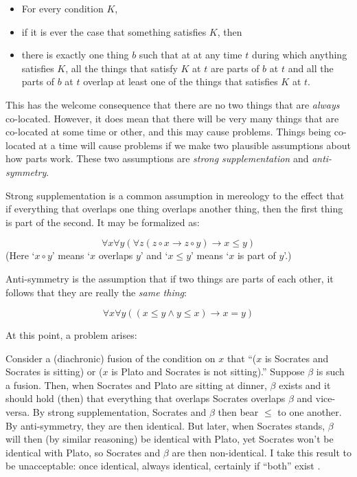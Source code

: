 \documentclass[11pt]{article}
\newenvironment{squote}{%
\begin{spacing}{1}
\begin{list}{}{%
\setlength{\labelwidth}{0pt}%
\rightmargin\leftmargin%
}
\item\relax
}{%
\end{list}%
\end{spacing}
}
\begin{document}
\begin{spacing}{1.5}
\begin{itemize}
  \item For every condition $K$,
  \item if it is ever the case that something satisfies $K$, then
  \item there is exactly one thing $b$ such that at at any time $t$
    during which anything satisfies $K$, all the things that satisfy
    $K$ at $t$ are parts of $b$ at $t$ and all the parts of $b$ at $t$
    overlap at least one of the things that satisfies $K$ at $t$.
\end{itemize}

This has the welcome consequence that there are no two things that are
{\em always} co-located.  However, it does mean that there will be
very many things that are co-located at some time or other, and this
may cause problems.  Things being co-located at a time will cause
problems if we make two plausible assumptions about how parts work.
These two assumptions are {\em strong supplementation} and {\em
  anti-symmetry}.

Strong supplementation is a common assumption in mereology to the
effect that if everything that overlaps one thing overlaps another
thing, then the first thing is part of the second.  It may be
formalized as:

\begin{displaymath}
\forall x \forall y ( \forall z ( z \circ x \rightarrow z \circ y )
\rightarrow x \leq y )
\end{displaymath}
(Here `$x \circ y$' means `$x$ overlaps $y$' and `$x \leq y$' means
`$x$ is part of $y$'.)

Anti-symmetry is the assumption that if two things are parts of each
other, it follows that they are really the {\em same thing}:

\begin{displaymath}
\forall x \forall y ( ( x \leq y \wedge y \leq x ) \rightarrow x = y )
\end{displaymath}

At this point, a problem arises:

\begin{squote}
Consider a (diachronic) fusion of the condition on $x$ that ``($x$ is
Socrates and Socrates is sitting) or ($x$ is Plato and Socrates is not
sitting).''  Suppose $\beta$ is such a fusion.  Then, when Socrates
and Plato are sitting at dinner, $\beta$ exists and it should hold
(then) that everything that overlaps Socrates overlaps $\beta$ and
vice-versa.  By strong supplementation, Socrates and $\beta$ then bear
$\leq$ to one another.  By anti-symmetry, they are then identical.
But later, when Socrates stands, $\beta$ will then (by similar
reasoning) be identical with Plato, yet Socrates won't be identical
with Plato, so Socrates and $\beta$ are then non-identical.  I take
this result to be unacceptable: once identical, always identical,
certainly if ``both'' exist \citeyearpar[sec. 3.1.2]{hovda2011}.
\end{squote}


\end{spacing}
\end{document}
